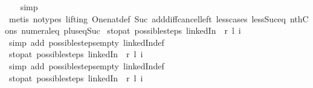 \begin{isabellebody}
\ \ \isamarkupfalse%
\ simp\isanewline
\ \ \isamarkupfalse%
\ {\isacharparenleft}metis\ {\isacharparenleft}no{\isacharunderscore}types{\isacharcomma}\ lifting{\isacharparenright}\ One{\isacharunderscore}nat{\isacharunderscore}def\ Suc{\isacharunderscore}{}\ add{\isacharunderscore}diff{\isacharunderscore}cancel{\isacharunderscore}left{\isacharprime}\ less{\isacharunderscore}{}{\isacharunderscore}cases\ less{\isacharunderscore}Suc{\isacharunderscore}eq\ nth{\isacharunderscore}Cons{\isacharprime}\ numeral{\isacharunderscore}{}{\isacharunderscore}eq{\isacharunderscore}{}\ plus{\isacharunderscore}{}{\isacharunderscore}eq{\isacharunderscore}Suc{\isacharparenright}%
\endisatagproof
{\isafoldproof}%
%
\isadelimproof
\isanewline
%
\endisadelimproof
\isanewline
{}\isamarkupfalse%
\ stop{\isacharunderscore}at{\isacharunderscore}{}{\isacharcolon}\ {\isachardoublequoteopen}possible{\isacharunderscore}steps\ linkedIn\ {}\ r\ l\ i\ {\isacharequal}\ {\isacharbraceleft}{\isacharbar}{\isacharbar}{\isacharbraceright}{\isachardoublequoteclose}\isanewline
%
\isadelimproof
\ \ %
\endisadelimproof
%
\isatagproof
{}\isamarkupfalse%
\ {\isacharparenleft}simp\ add{\isacharcolon}\ possible{\isacharunderscore}steps{\isacharunderscore}empty\ linkedIn{\isacharunderscore}def{\isacharparenright}%
\endisatagproof
{\isafoldproof}%
%
\isadelimproof
\isanewline
%
\endisadelimproof
\isanewline
{}\isamarkupfalse%
\ stop{\isacharunderscore}at{\isacharunderscore}{}{\isacharcolon}\ {\isachardoublequoteopen}possible{\isacharunderscore}steps\ linkedIn\ {}\ r\ l\ i\ {\isacharequal}\ {\isacharbraceleft}{\isacharbar}{\isacharbar}{\isacharbraceright}{\isachardoublequoteclose}\isanewline
%
\isadelimproof
\ \ %
\endisadelimproof
%
\isatagproof
{}\isamarkupfalse%
\ {\isacharparenleft}simp\ add{\isacharcolon}\ possible{\isacharunderscore}steps{\isacharunderscore}empty\ linkedIn{\isacharunderscore}def{\isacharparenright}%
\endisatagproof
{\isafoldproof}%
%
\isadelimproof
\isanewline
%
\endisadelimproof
\isanewline
{}\isamarkupfalse%
\ stop{\isacharunderscore}at{\isacharunderscore}{}{\isacharcolon}\ {\isachardoublequoteopen}possible{\isacharunderscore}steps\ linkedIn\ {}\ r\ l\ i\ {\isacharequal}\ {\isacharbraceleft}{\isacharbar}{\isacharbar}{\isacharbraceright}{\isachardoublequoteclose}\isanewline
%
\isadelimproof
\ \ %
\endisadelimproof
%
\isatagproof
{}\isamarkupfalse%

\end{isabellebody}
